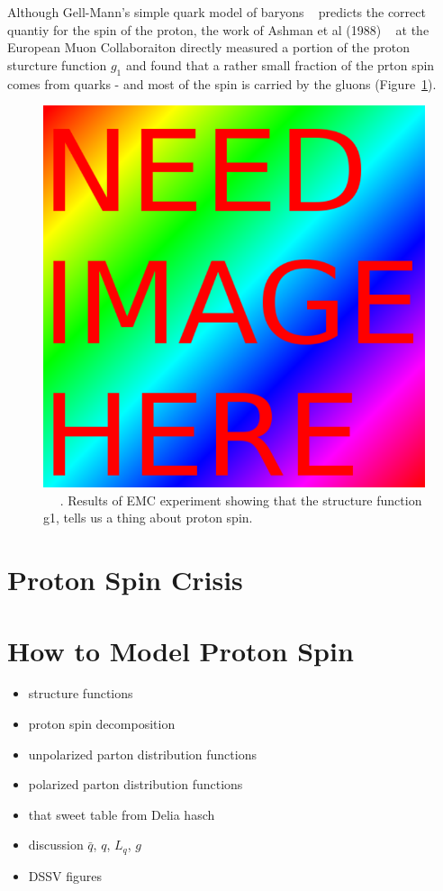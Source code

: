 Although Gell-Mann's simple quark model of baryons ~\needcite{} predicts the
correct quantiy for the spin of the proton, the work of Ashman et al (1988)
~\needcite{} at the European Muon Collaboraiton directly measured a portion of
the proton sturcture function $g_1$ and found that a rather small fraction of
the prton spin comes from quarks - and most of the spin is carried by the
gluons (Figure~\ref{fig:emc_g1_result}). 

\begin{figure}[H]
	\begin{center}
	\includegraphics[width=0.5\linewidth]{../filler/squareimg.png}
	\caption{~\needfig{} ~\needcap{}. Results of EMC experiment showing that the structure
	function g1, tells us a thing about proton spin.}
	\label{fig:emc_g1_result}
\end{center}
\end{figure}

\section{Proton Spin Crisis}
\section{How to Model Proton Spin}
\begin{itemize}
		\item structure functions
		\item proton spin decomposition
		\item unpolarized parton distribution functions
		\item polarized parton distribution functions
		\item that sweet table from Delia hasch
		\item discussion $\bar{q}$, $q$, $L_q$, $g$
		\item DSSV figures
\end{itemize}
